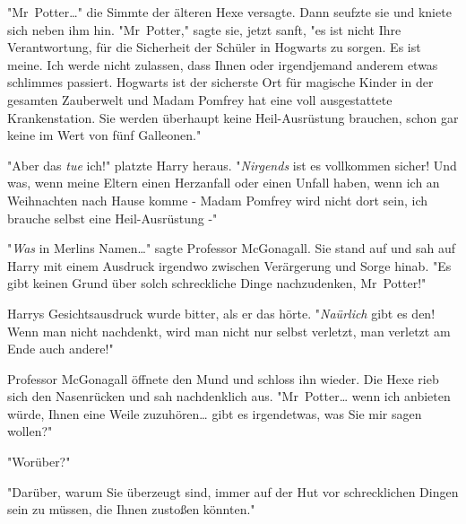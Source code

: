 {"Mr~Potter…" die Simmte der älteren Hexe versagte. Dann seufzte sie und kniete sich neben ihm hin. "Mr~Potter," sagte sie, jetzt sanft, "es ist nicht Ihre Verantwortung, für die Sicherheit der Schüler in Hogwarts zu sorgen. Es ist meine. Ich werde nicht zulassen, dass Ihnen oder irgendjemand anderem etwas schlimmes passiert. Hogwarts ist der sicherste Ort für magische Kinder in der gesamten Zauberwelt und Madam Pomfrey hat eine voll ausgestattete Krankenstation. Sie werden überhaupt keine Heil-Ausrüstung brauchen, schon gar keine im Wert von fünf Galleonen."

"Aber das \emph{tue} ich!" platzte Harry heraus. "\emph{Nirgends} ist es vollkommen sicher! Und was, wenn meine Eltern einen Herzanfall oder einen Unfall haben, wenn ich an Weihnachten nach Hause komme - Madam Pomfrey wird nicht dort sein, ich brauche selbst eine Heil-Ausrüstung -"

"\emph{Was} in Merlins Namen…" sagte Professor McGonagall. Sie stand auf und sah auf Harry mit einem Ausdruck irgendwo zwischen Verärgerung und Sorge hinab. "Es gibt keinen Grund über solch schreckliche Dinge nachzudenken, Mr~Potter!"

Harrys Gesichtsausdruck wurde bitter, als er das hörte. "\emph{Naürlich} gibt es den! Wenn man nicht nachdenkt, wird man nicht nur selbst verletzt, man verletzt am Ende auch andere!"

Professor McGonagall öffnete den Mund und schloss ihn wieder. Die Hexe rieb sich den Nasenrücken und sah nachdenklich aus. "Mr~Potter… wenn ich anbieten würde, Ihnen eine Weile zuzuhören… gibt es irgendetwas, was Sie mir sagen wollen?"

"Worüber?"

"Darüber, warum Sie überzeugt sind, immer auf der Hut vor schrecklichen Dingen sein zu müssen, die Ihnen zustoßen könnten."

}
